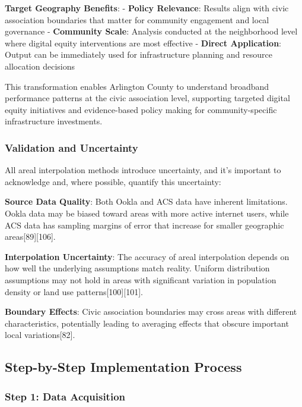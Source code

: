 \documentclass[
  letterpaper,
  DIV=11,
  numbers=noendperiod]{scrartcl}
\begin{document}
\textbf{Target Geography Benefits}: - \textbf{Policy Relevance}: Results
align with civic association boundaries that matter for community
engagement and local governance - \textbf{Community Scale}: Analysis
conducted at the neighborhood level where digital equity interventions
are most effective - \textbf{Direct Application}: Output can be
immediately used for infrastructure planning and resource allocation
decisions

This transformation enables Arlington County to understand broadband
performance patterns at the civic association level, supporting targeted
digital equity initiatives and evidence-based policy making for
community-specific infrastructure investments.

\subsubsection{Validation and
Uncertainty}\label{validation-and-uncertainty}

All areal interpolation methods introduce uncertainty, and it's
important to acknowledge and, where possible, quantify this uncertainty:

\textbf{Source Data Quality}: Both Ookla and ACS data have inherent
limitations. Ookla data may be biased toward areas with more active
internet users, while ACS data has sampling margins of error that
increase for smaller geographic areas{[}89{]}{[}106{]}.

\textbf{Interpolation Uncertainty}: The accuracy of areal interpolation
depends on how well the underlying assumptions match reality. Uniform
distribution assumptions may not hold in areas with significant
variation in population density or land use patterns{[}100{]}{[}101{]}.

\textbf{Boundary Effects}: Civic association boundaries may cross areas
with different characteristics, potentially leading to averaging effects
that obscure important local variations{[}82{]}.

\subsection{Step-by-Step Implementation
Process}\label{step-by-step-implementation-process}

\subsubsection{Step 1: Data Acquisition}\label{step-1-data-acquisition}
\end{document}
